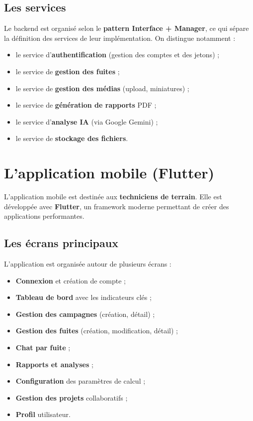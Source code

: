 \documentclass[12pt,a4paper,oneside]{report}
\begin{document}
\subsection{Les services}

Le backend est organisé selon le \textbf{pattern Interface + Manager}, ce qui sépare la définition des services de leur implémentation. On distingue notamment :
\begin{itemize}
    \item le service d'\textbf{authentification} (gestion des comptes et des jetons) ;
    \item le service de \textbf{gestion des fuites} ;
    \item le service de \textbf{gestion des médias} (upload, miniatures) ;
    \item le service de \textbf{génération de rapports} PDF ;
    \item le service d'\textbf{analyse IA} (via Google Gemini) ;
    \item le service de \textbf{stockage des fichiers}.
\end{itemize}

\section{L'application mobile (Flutter)}

L'application mobile est destinée aux \textbf{techniciens de terrain}. Elle est développée avec \textbf{Flutter}, un framework moderne permettant de créer des applications performantes.

\subsection{Les écrans principaux}

L'application est organisée autour de plusieurs écrans :
\begin{itemize}
    \item \textbf{Connexion} et création de compte ;
    \item \textbf{Tableau de bord} avec les indicateurs clés ;
    \item \textbf{Gestion des campagnes} (création, détail) ;
    \item \textbf{Gestion des fuites} (création, modification, détail) ;
    \item \textbf{Chat par fuite} ;
    \item \textbf{Rapports et analyses} ;
    \item \textbf{Configuration} des paramètres de calcul ;
    \item \textbf{Gestion des projets} collaboratifs ;
    \item \textbf{Profil} utilisateur.
\end{itemize}
\end{document}
